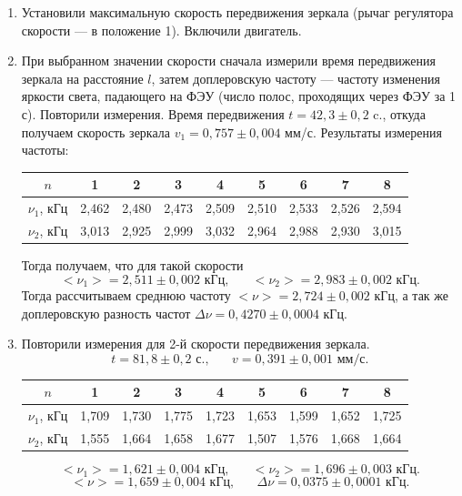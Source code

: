 \documentclass[a4paper,12pt]{article}
\begin{document}
\begin{enumerate}
	\item Установили максимальную скорость передвижения зеркала (рычаг регулятора скорости --- в положение 1). Включили двигатель.
	\item При выбранном значении скорости сначала измерили время передвижения зеркала на расстояние $l$, затем доплеровскую частоту --- частоту изменения яркости света, падающего на ФЭУ (число полос, проходящих через ФЭУ за 1 с). Повторили измерения.
	Время передвижения $t=42{,}3\pm0{,}2$ c., откуда получаем скорость зеркала $v_1=0{,}757\pm0{,}004$ мм/с. Результаты измерения частоты:
	\begin{center}
		\begin{tabular}{|c|c|c|c|c|c|c|c|c|}
			\hline
			$n$ & 1 & 2 & 3 & 4 & 5 & 6 & 7 & 8 \\ \hline
			$\nu_1$, кГц & 2,462 & 2,480 & 2,473 & 2,509 & 2,510 & 2,533 & 2,526 & 2,594 \\ \hline
			$\nu_2$, кГц & 3,013 & 2,925 & 2,999 & 3,032 & 2,964 & 2,988 & 2,930 & 3,015 \\ \hline
		\end{tabular}
	\end{center}
	Тогда получаем, что для такой скорости 
	\begin{equation*}
	<\nu_1> = 2{,}511\pm0{,}002\text{ кГц},\;\;\;\;\;\; <\nu_2>=2{,}983\pm0{,}002\text{ кГц}.
	\end{equation*} 
	Тогда рассчитываем среднюю частоту $<\nu> = 2{,}724\pm0{,}002$ кГц, а так же доплеровскую разность частот $\Delta\nu=0{,}4270\pm0{,}0004$ кГц.
	\item Повторили измерения для 2-й скорости передвижения зеркала.
	\begin{equation*}
	t = 81{,}8\pm0{,}2 \text{ с.}, \;\;\;\;\;\; v = 0{,}391\pm0{,}001\text{ мм/с}.
	\end{equation*}
	\begin{center}
		\begin{tabular}{|c|c|c|c|c|c|c|c|c|}
			\hline
			$n$ & 1 & 2 & 3 & 4 & 5 & 6 & 7 & 8 \\ \hline
			$\nu_1$, кГц & 1,709 & 1,730 & 1,775 & 1,723 & 1,653 & 1,599 & 1,652 & 1,725 \\ \hline
			$\nu_2$, кГц & 1,555 & 1,664 & 1,658 & 1,677 & 1,507 & 1,576 & 1,668 & 1,664 \\ \hline
		\end{tabular}
	\end{center}
	\begin{equation*}
	<\nu_1> = 1{,}621\pm0{,}004\text{ кГц},\;\;\;\;\;\; <\nu_2>=1{,}696\pm0{,}003\text{ кГц}.
	\end{equation*} 
	\begin{equation*}
	<\nu> = 1{,}659\pm0{,}004\text{ кГц},\;\;\;\;\;\; \Delta\nu=0{,}0375\pm0{,}0001\text{ кГц}.
	\end{equation*}
	

\end{enumerate}
\end{document}
